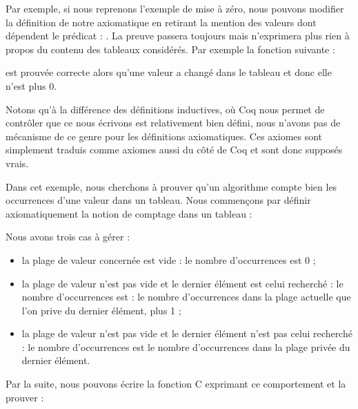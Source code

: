 Par exemple, si nous reprenons l'exemple de mise à zéro, nous pouvons modifier
la définition de notre axiomatique en retirant la mention des valeurs dont
dépendent le prédicat : . La preuve passera toujours
mais n'exprimera plus rien à propos du contenu des tableaux considérés.
Par exemple la fonction suivante :




est prouvée correcte alors qu'une valeur a changé dans le tableau et donc elle
n'est plus 0.


Notons qu'à la différence des définitions inductives, où Coq nous permet de contrôler
que ce nous écrivons est relativement bien défini, nous n'avons pas de mécanisme de
ce genre pour les définitions axiomatiques. Ces axiomes sont simplement traduis
comme axiomes aussi du côté de Coq et sont donc supposés vrais.





Dans cet exemple, nous cherchons à prouver qu'un algorithme compte bien les
occurrences d'une valeur dans un tableau. Nous commençons par définir
axiomatiquement la notion de comptage dans un tableau :





Nous avons trois cas à gérer :



\begin{itemize}
\item la plage de valeur concernée est vide : le nombre d'occurrences est 0 ;
\item la plage de valeur n'est pas vide et le dernier élément est celui recherché :
le nombre d'occurrences est : le nombre d'occurrences dans la plage actuelle que
l'on prive du dernier élément, plus 1 ;
\item la plage de valeur n'est pas vide et le dernier élément n'est pas celui
recherché : le nombre d'occurrences est le nombre d'occurrences dans la plage
privée du dernier élément.
\end{itemize}


Par la suite, nous pouvons écrire la fonction C exprimant ce comportement et la
prouver :






